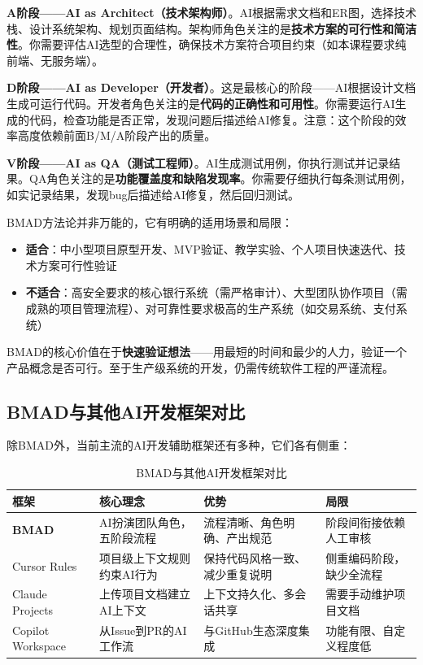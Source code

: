 \textbf{A阶段——AI as Architect（技术架构师）}。AI根据需求文档和ER图，选择技术栈、设计系统架构、规划页面结构。架构师角色关注的是\textbf{技术方案的可行性和简洁性}。你需要评估AI选型的合理性，确保技术方案符合项目约束（如本课程要求纯前端、无服务端）。

\textbf{D阶段——AI as Developer（开发者）}。这是最核心的阶段——AI根据设计文档生成可运行代码。开发者角色关注的是\textbf{代码的正确性和可用性}。你需要运行AI生成的代码，检查功能是否正常，发现问题后描述给AI修复。注意：这个阶段的效率高度依赖前面B/M/A阶段产出的质量。

\textbf{V阶段——AI as QA（测试工程师）}。AI生成测试用例，你执行测试并记录结果。QA角色关注的是\textbf{功能覆盖度和缺陷发现率}。你需要仔细执行每条测试用例，如实记录结果，发现bug后描述给AI修复，然后回归测试。

\begin{theorybox}[BMAD方法论的适用边界]
BMAD方法论并非万能的，它有明确的适用场景和局限：
\begin{itemize}[leftmargin=2em]
  \item \textbf{适合}：中小型项目原型开发、MVP验证、教学实验、个人项目快速迭代、技术方案可行性验证
  \item \textbf{不适合}：高安全要求的核心银行系统（需严格审计）、大型团队协作项目（需成熟的项目管理流程）、对可靠性要求极高的生产系统（如交易系统、支付系统）
\end{itemize}
BMAD的核心价值在于\textbf{快速验证想法}——用最短的时间和最少的人力，验证一个产品概念是否可行。至于生产级系统的开发，仍需传统软件工程的严谨流程。
\end{theorybox}

\subsection{BMAD与其他AI开发框架对比}

除BMAD外，当前主流的AI开发辅助框架还有多种，它们各有侧重：

\begin{table}[H]
\centering
\small
\begin{tabular}{lp{3cm}p{3.5cm}p{3.5cm}}
\toprule
\textbf{框架} & \textbf{核心理念} & \textbf{优势} & \textbf{局限} \\
\midrule
\textbf{BMAD} & AI扮演团队角色，五阶段流程 & 流程清晰、角色明确、产出规范 & 阶段间衔接依赖人工审核 \\
Cursor Rules & 项目级上下文规则约束AI行为 & 保持代码风格一致、减少重复说明 & 侧重编码阶段，缺少全流程 \\
Claude Projects & 上传项目文档建立AI上下文 & 上下文持久化、多会话共享 & 需要手动维护项目文档 \\
Copilot Workspace & 从Issue到PR的AI工作流 & 与GitHub生态深度集成 & 功能有限、自定义程度低 \\
\bottomrule
\end{tabular}
\caption{BMAD与其他AI开发框架对比}
\end{table}

